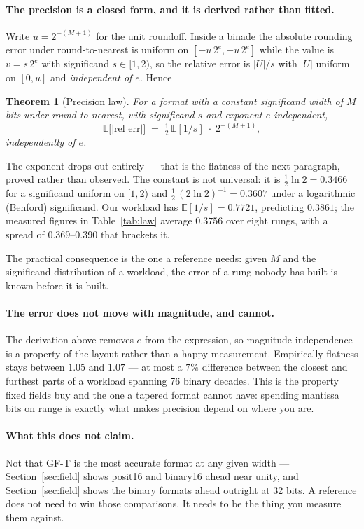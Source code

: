 \documentclass[11pt]{article}
\newtheorem{theorem}{Theorem}
\theoremstyle{definition}
\begin{document}
\paragraph{The precision is a closed form, and it is derived rather than fitted.}
Write $u = 2^{-(M+1)}$ for the unit roundoff. Inside a binade the absolute
rounding error under round-to-nearest is uniform on $[-u\,2^{e}, +u\,2^{e}]$
while the value is $v = s\,2^{e}$ with significand $s \in [1,2)$, so the relative
error is $|U|/s$ with $|U|$ uniform on $[0,u]$ and \emph{independent of $e$}.
Hence
\begin{theorem}[Precision law]\label{thm:law}
For a format with a constant significand width of $M$ bits under
round-to-nearest, with significand $s$ and exponent $e$ independent,
\[
  \mathbb{E}\bigl[|\text{rel err}|\bigr] \;=\; \tfrac{1}{2}\,\mathbb{E}[1/s]\;\cdot\;2^{-(M+1)} ,
\]
independently of $e$.
\end{theorem}
The exponent drops out entirely --- that is the flatness of the next paragraph,
proved rather than observed. The constant is not universal: it is
$\tfrac{1}{2}\ln 2 = 0.3466$ for a significand uniform on $[1,2)$ and
$\tfrac{1}{2}\,(2\ln 2)^{-1} = 0.3607$ under a logarithmic (Benford) significand.
Our workload has $\mathbb{E}[1/s] = 0.7721$, predicting $0.3861$; the measured
figures in Table~\ref{tab:law} average $0.3756$ over eight rungs, with a spread
of $0.369$--$0.390$ that brackets it.

The practical consequence is the one a reference needs: given $M$ and the
significand distribution of a workload, the error of a rung nobody has built is
known before it is built.

\paragraph{The error does not move with magnitude, and cannot.} The derivation
above removes $e$ from the expression, so magnitude-independence is a property of
the layout rather than a happy measurement. Empirically flatness stays between
$1.05$ and $1.07$ --- at most a $7\%$ difference between the closest and furthest
parts of a workload spanning 76 binary decades. This is the property fixed fields
buy and the one a tapered format cannot have: spending mantissa bits on range is
exactly what makes precision depend on where you are.

\paragraph{What this does not claim.} Not that GF-T is the most accurate format
at any given width --- Section~\ref{sec:field} shows posit16 and binary16 ahead
near unity, and Section~\ref{sec:field} shows the binary formats ahead outright at
32 bits. A reference does not need to win those comparisons. It needs to be the
thing you measure them against.
\end{document}

